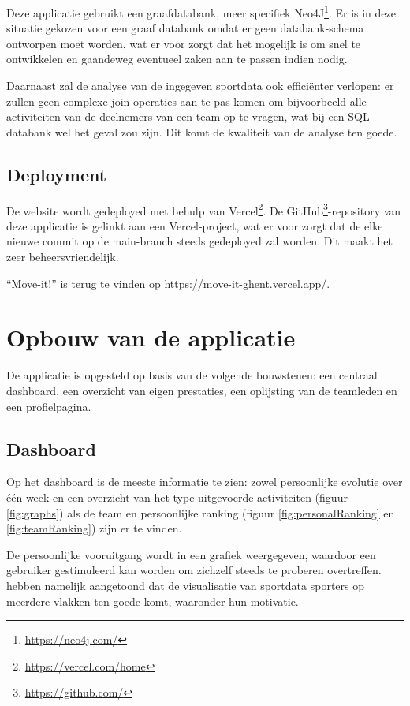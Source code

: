 Deze applicatie gebruikt een graafdatabank, meer specifiek Neo4J\footnote{\href{https://neo4j.com/}{https://neo4j.com/}}. Er is in deze situatie gekozen voor een graaf databank omdat er geen databank-schema ontworpen moet worden, wat er voor zorgt dat het mogelijk is om snel te ontwikkelen en gaandeweg eventueel zaken aan te passen indien nodig.

Daarnaast zal de analyse van de ingegeven sportdata ook efficiënter verlopen: er zullen geen complexe join-operaties aan te pas komen om bijvoorbeeld alle activiteiten van de deelnemers van een team op te vragen, wat bij een SQL-databank wel het geval zou zijn. Dit komt de kwaliteit van de analyse ten goede.

\subsection{Deployment}

De website wordt gedeployed met behulp van Vercel\footnote{\href{https://vercel.com/home}{https://vercel.com/home}}. De GitHub\footnote{\href{https://github.com/}{https://github.com/}}-repository van deze applicatie is gelinkt aan een Vercel-project, wat er voor zorgt dat de elke \linebreak nieuwe commit op de main-branch steeds gedeployed zal worden. Dit maakt het zeer beheersvriendelijk.

``Move-it!'' is terug te vinden op \href{https://move-it-ghent.vercel.app/}{https://move-it-ghent.vercel.app/}.

\section{Opbouw van de applicatie}

De applicatie is opgesteld op basis van de volgende bouwstenen: een centraal dashboard, een overzicht van eigen prestaties, een oplijsting van de teamleden en een profielpagina.

\subsection{Dashboard}
Op het dashboard is de meeste informatie te zien: zowel persoonlijke evolutie over één week en een overzicht van het type uitgevoerde activiteiten (figuur \ref{fig:graphs}) als de team en persoonlijke ranking (figuur \ref{fig:personalRanking} en \ref{fig:teamRanking}) zijn er te vinden.

De persoonlijke vooruitgang wordt in een grafiek weergegeven, waardoor een gebruiker gestimuleerd kan worden om zichzelf steeds te proberen overtreffen. \linebreak \textcite{Schiewe2020} hebben namelijk aangetoond dat de visualisatie van sportdata sporters op meerdere vlakken ten goede komt, waaronder hun motivatie.

